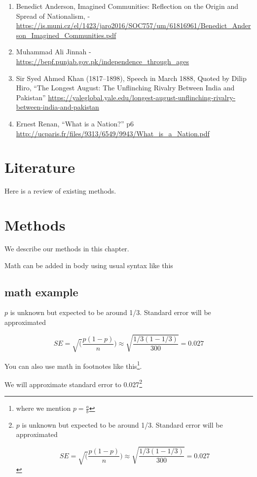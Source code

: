 \documentclass[
]{book}
\begin{document}
\begin{enumerate}
\def\labelenumi{\arabic{enumi}.}
\item
  Benedict Anderson, Imagined Communities: Reflection on the Origin and Spread of Nationalism, - \url{https://is.muni.cz/el/1423/jaro2016/SOC757/um/61816961/Benedict_Anderson_Imagined_Communities.pdf}
\item
  Muhammad Ali Jinnah - \url{https://bepf.punjab.gov.pk/independence_through_ages}
\item
  Sir Syed Ahmed Khan (1817--1898), Speech in March 1888, Quoted by Dilip Hiro, ``The Longest August: The Unflinching Rivalry Between India and Pakistan'' \url{https://yaleglobal.yale.edu/longest-august-unflinching-rivalry-between-india-and-pakistan}
\item
  Ernest Renan, ``What is a Nation?'' p6 \url{http://ucparis.fr/files/9313/6549/9943/What_is_a_Nation.pdf}
\end{enumerate}

\hypertarget{literature}{%
\chapter{Literature}\label{literature}}

Here is a review of existing methods.

\hypertarget{methods}{%
\chapter{Methods}\label{methods}}

We describe our methods in this chapter.

Math can be added in body using usual syntax like this

\hypertarget{math-example}{%
\section{math example}\label{math-example}}

\(p\) is unknown but expected to be around 1/3. Standard error will be approximated

\[
SE = \sqrt(\frac{p(1-p)}{n}) \approx \sqrt{\frac{1/3 (1 - 1/3)} {300}} = 0.027
\]

You can also use math in footnotes like this\footnote{where we mention \(p = \frac{a}{b}\)}.

We will approximate standard error to 0.027\footnote{\(p\) is unknown but expected to be around 1/3. Standard error will be approximated

  \[
  SE = \sqrt(\frac{p(1-p)}{n}) \approx \sqrt{\frac{1/3 (1 - 1/3)} {300}} = 0.027
  \]}
\end{document}
